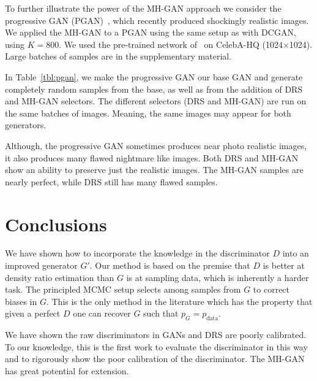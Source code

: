 \documentclass{article}
\newcommand{\PG}{{p_G}}
\newcommand{\PR}{{p_{\textrm{data}}}}
\begin{document}
To further illustrate the power of the MH-GAN approach we consider the progressive GAN (PGAN)~\citep{Karras2017}, which recently produced shockingly realistic images.
We applied the MH-GAN to a PGAN using the same setup as with DCGAN, using $K=800$.
We used the pre-trained network of~\citet{Karras2017} on CelebA-HQ (1024$\times$1024)\@.
Large batches of samples are in the supplementary material.

In Table~\ref{tbl:pgan}, we make the progressive GAN our base GAN and generate completely random samples from the base, as well as from the addition of DRS and MH-GAN selectors.
The different selectors (DRS and MH-GAN) are run on the same batches of images.
Meaning, the same images may appear for both generators.

Although, the progressive GAN sometimes produces near photo realistic images, it also produces many flawed nightmare like images.
Both DRS and MH-GAN show an ability to preserve just the realistic images.
The MH-GAN samples are nearly perfect, while DRS still has many flawed samples.

\section{Conclusions}
\label{sec:conclusions}

We have shown how to incorporate the knowledge in the discriminator $D$ into an improved generator $G'$.
Our method is based on the premise that $D$ is better at density ratio estimation than $G$ is at sampling data, which is inherently a harder task.
The principled MCMC setup selects among samples from $G$ to correct biases in $G$.
This is the only method in the literature which has the property that given a perfect $D$ one can recover $G$ such that $\PG = \PR$.

We have shown the raw discriminators in GANs and DRS are poorly calibrated.
To our knowledge, this is the first work to evaluate the discriminator in this way and to rigorously show the poor calibration of the discriminator.
The MH-GAN has great potential for extension.

\fboxsep=1.5pt  %
\newcommand{\unreal}[1]{\fcolorbox{white}{red}{#1}}
\end{document}
